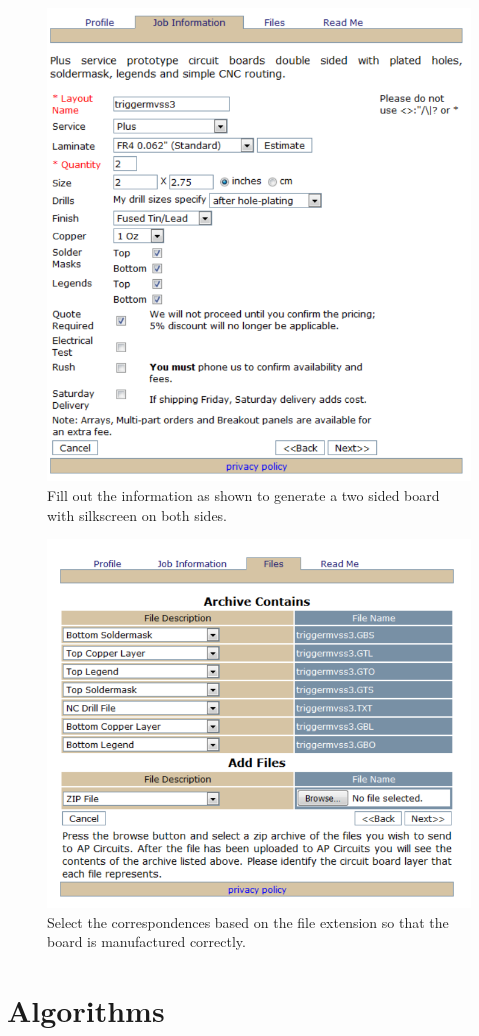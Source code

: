 \documentclass{report}
\begin{document}
	\begin{figure}[H]
		\centering
		\includegraphics[scale = 0.7]{../figures/PCBorder1.PNG}
		\caption{Fill out the information as shown to generate a two sided board with silkscreen on both sides.}
		\label{fig:gerber}
	\end{figure}
	
	\begin{figure}[H]
		\centering
		\includegraphics[scale = 0.7]{../figures/PCBorder2.PNG}
		\caption{Select the correspondences based on the file extension so that the board is manufactured correctly.}
		\label{fig:gerber}
	\end{figure}
	
	\chapter{Algorithms}
	
\end{document}
